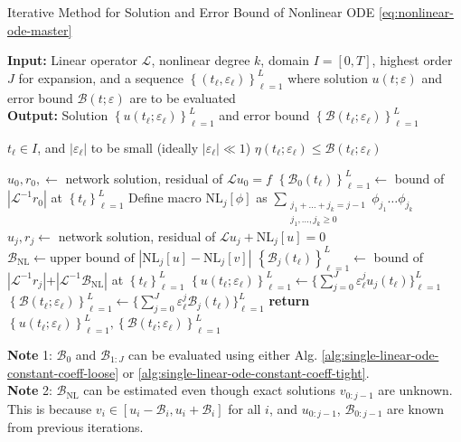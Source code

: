 \documentclass{uai2023}
\newcommand{\Err}{\eta}
\newcommand{\Bound}{\mathcal{B}}
\renewcommand{\L}{\mathcal{L}}
\begin{document}
    \begin{algorithm}
        \small
        \caption{Iterative Method for Solution and Error Bound of Nonlinear ODE \ref{eq:nonlinear-ode-master}} \label{alg:nonlinear-iterative}
        \textbf{Input:} Linear operator $\L$, nonlinear degree $k$, domain $I=[0, T]$, highest order $J$ for expansion, and a sequence $\left\{(t_\ell, \varepsilon_\ell)\right\}_{\ell=1}^{L}$ where solution $u(t; \varepsilon)$ and error bound $\Bound(t; \varepsilon)$ are to be evaluated \\
        \textbf{Output:} Solution $\left\{u(t_\ell; \varepsilon_\ell)\right\}_{\ell=1}^{L}$ and error bound $\left\{\Bound(t_\ell; \varepsilon_\ell)\right\}_{\ell=1}^{L}$ 
        \begin{algorithmic}
            \Require $t_\ell \in I$, and $|\varepsilon_\ell|$ to be small (ideally $|\varepsilon_\ell| \ll 1$)
            \Ensure $\Err(t_\ell; \varepsilon_\ell) \leq \Bound(t_\ell; \varepsilon_\ell)$ 

            \State $u_0, r_0, \gets$ network solution, residual of $\L u_0 = f$
            \State $\left\{\Bound_{0}(t_\ell)\right\}_{\ell=1}^L \gets$ bound of $\left|\L^{-1}r_0\right|$ at $\left\{t_\ell\right\}_{\ell=1}^L$
                \State Define macro $\text{NL}_j[\phi]$ as $\sum_{\substack{j_1 + \dots + j_k = j-1\\ j_1, \dots, j_k \geq 0}} \phi_{j_1} \dots \phi_{j_k}$
                \State $u_j, r_j \gets$ network solution, residual of $\L u_j + \text{NL}_j[u] = 0$
                \State $\Bound_{\text{NL}} \gets \text{upper bound of }|\text{NL}_j[u] - \text{NL}_j[v]|$
                \State $\left\{\Bound_{j}(t_\ell)\right\}_{\ell=1}^L \gets$  bound of $|\L^{-1}r_j|$+$|\L^{-1}\Bound_{\text{NL}}|$ at $\left\{t_\ell\right\}_{\ell=1}^L$
            \EndFor
            \State $\left\{u(t_\ell; \varepsilon_\ell)\right\}_{\ell=1}^L \gets \big\{\sum_{j=0}^{J}\varepsilon_\ell^j u_j(t_\ell)\big\}_{\ell=1}^L $ 
            \State $\left\{\Bound(t_\ell; \varepsilon_\ell)\right\}_{\ell=1}^L \gets \big\{\sum_{j=0}^{J}\varepsilon_\ell^j \Bound_j(t_\ell)\big\}_{\ell=1}^L $ 
            \State \textbf{return} $\left\{u(t_\ell; \varepsilon_\ell)\right\}_{\ell=1}^L, \left\{\Bound(t_\ell; \varepsilon_\ell)\right\}_{\ell=1}^L$
        \end{algorithmic}
        \vspace{0.5em}

        \textbf{Note} 1: $\Bound_0$ and $\Bound_{1:J}$ can be evaluated using either Alg. \ref{alg:single-linear-ode-constant-coeff-loose} or \ref{alg:single-linear-ode-constant-coeff-tight}.\\
        \textbf{Note} 2: $\Bound_\text{NL}$ can be estimated even though exact solutions $v_{0:j-1}$ are unknown. This is because $v_i \in [u_i - \Bound_i, u_i+\Bound_i]$ for all $i$, and $u_{0:j-1}$, $\Bound_{0:j-1}$ are known from previous iterations.
    \end{algorithm}
\end{document}
